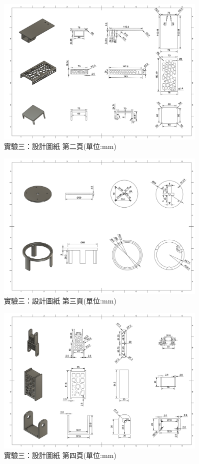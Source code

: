 \documentclass[class=NCU_thesis, crop=false]{standalone}
\begin{document}
\begin{figure}[htbp]
    \centering
    \includegraphics[width=0.9\textwidth]{figures/Armv3 (2).PNG}
    \caption{實驗三：設計圖紙 第二頁(單位:mm)}
    \label{fig:Armv3Drawing_p2}
\end{figure}

\begin{figure}[htbp]
    \centering
    \includegraphics[width=0.9\textwidth]{figures/Armv3 (3).PNG}
    \caption{實驗三：設計圖紙 第三頁(單位:mm)}
    \label{fig:Armv3Drawing_p3}
\end{figure}

\begin{figure}[htbp]
    \centering
    \includegraphics[width=0.9\textwidth]{figures/Armv3 (4).PNG}
    \caption{實驗三：設計圖紙 第四頁(單位:mm)}
    \label{fig:Armv3Drawing_p4}
\end{figure}
\end{document}
